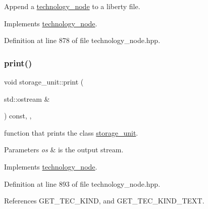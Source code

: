 Append a \hyperlink{structtechnology__node}{technology\+\_\+node} to a liberty file. 



Implements \hyperlink{structtechnology__node_a7e56b3bd8c693bb664fae9e5538b2526}{technology\+\_\+node}.



Definition at line 878 of file technology\+\_\+node.\+hpp.

\mbox{\label{structstorage__unit_a8c2a91597aa05ac41cd71a5df907fd8f}} 
\subsubsection{\texorpdfstring{print()}{print()}}
{\footnotesize\ttfamily void storage\+\_\+unit\+::print (\begin{DoxyParamCaption}\item[{std\+::ostream \&}]{ }\end{DoxyParamCaption}) const\hspace{0.3cm}{\ttfamily [inline]}, {\ttfamily [override]}, {\ttfamily [virtual]}}



function that prints the class \hyperlink{structstorage__unit}{storage\+\_\+unit}. 


\begin{DoxyParams}{Parameters}
{\em os} & is the output stream. \\
\hline
\end{DoxyParams}


Implements \hyperlink{structtechnology__node_a44f347bae9b9b59726f323b5a6ad9ebf}{technology\+\_\+node}.



Definition at line 893 of file technology\+\_\+node.\+hpp.



References G\+E\+T\+\_\+\+T\+E\+C\+\_\+\+K\+I\+ND, and G\+E\+T\+\_\+\+T\+E\+C\+\_\+\+K\+I\+N\+D\+\_\+\+T\+E\+XT.

\mbox{\label{structstorage__unit_aaeebe9291ea4f0a68ad7d9f784804fa0}} 
